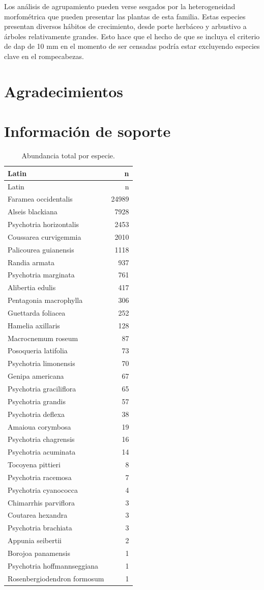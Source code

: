 \documentclass[11pt,]{article}
\begin{document}
Los análisis de agrupamiento pueden verse sesgados por la heterogeneidad
morfométrica que pueden presentar las plantas de esta familia. Estas
especies presentan diversos hábitos de crecimiento, desde porte herbáceo
y arbustivo a árboles relativamente grandes. Esto hace que el hecho de
que se incluya el criterio de dap de 10 mm en el momento de ser censadas
podría estar excluyendo especies clave en el rompecabezas.

\section{Agradecimientos}\label{agradecimientos}

\section{Información de soporte}\label{informaciuxf3n-de-soporte}

\begin{longtable}[]{@{}lr@{}}
\caption{\label{tab:abun_sp}Abundancia total por
especie.}\tabularnewline
\toprule
Latin & n\tabularnewline
\midrule
\endfirsthead
\toprule
Latin & n\tabularnewline
\midrule
\endhead
Faramea occidentalis & 24989\tabularnewline
Alseis blackiana & 7928\tabularnewline
Psychotria horizontalis & 2453\tabularnewline
Coussarea curvigemmia & 2010\tabularnewline
Palicourea guianensis & 1118\tabularnewline
Randia armata & 937\tabularnewline
Psychotria marginata & 761\tabularnewline
Alibertia edulis & 417\tabularnewline
Pentagonia macrophylla & 306\tabularnewline
Guettarda foliacea & 252\tabularnewline
Hamelia axillaris & 128\tabularnewline
Macrocnemum roseum & 87\tabularnewline
Posoqueria latifolia & 73\tabularnewline
Psychotria limonensis & 70\tabularnewline
Genipa americana & 67\tabularnewline
Psychotria graciliflora & 65\tabularnewline
Psychotria grandis & 57\tabularnewline
Psychotria deflexa & 38\tabularnewline
Amaioua corymbosa & 19\tabularnewline
Psychotria chagrensis & 16\tabularnewline
Psychotria acuminata & 14\tabularnewline
Tocoyena pittieri & 8\tabularnewline
Psychotria racemosa & 7\tabularnewline
Psychotria cyanococca & 4\tabularnewline
Chimarrhis parviflora & 3\tabularnewline
Coutarea hexandra & 3\tabularnewline
Psychotria brachiata & 3\tabularnewline
Appunia seibertii & 2\tabularnewline
Borojoa panamensis & 1\tabularnewline
Psychotria hoffmannseggiana & 1\tabularnewline
Rosenbergiodendron formosum & 1\tabularnewline
\bottomrule
\end{longtable}
\end{document}
